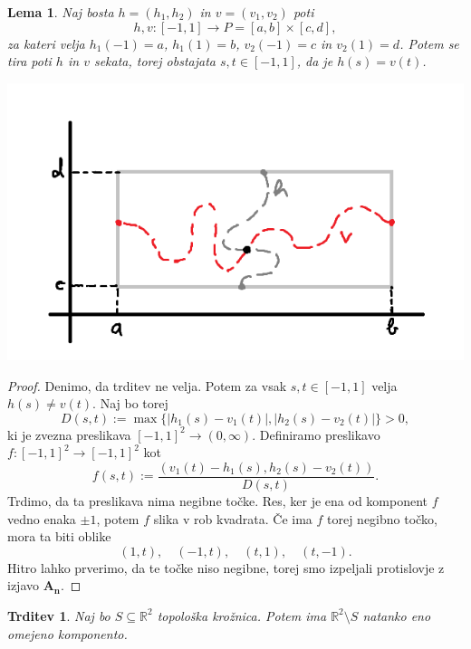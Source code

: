 \documentclass[10pt, a4paper]{article}
\newtheorem{trditev}[izr]{Trditev}
\newtheorem{lema}[izr]{Lema}
\newenvironment{noticeC}{%
  \tcolorbox[%
  notitle,
  empty,
  enhanced,  %
  breakable,
  coltext=black, 
  fontupper=\rmfamily,
  parbox=false,
  noparskip,
  sharp corners,
  boxrule=-1pt,  %
  frame hidden,
  left=7pt,  %
  right=7pt,
  top=5pt,
  bottom=5pt,
  before skip=2.5ex plus 2pt,
  after skip=2.5ex plus 2pt,
  overlay unbroken and last={%
  },
  ]}
{\endtcolorbox}
\newenvironment{dokaz}%
  {\begin{noticeC}\begin{proof}}%
  {\end{proof}\end{noticeC}}
\newcommand{\R}{\mathbb {R}}
\begin{document}
\begin{lema}
  Naj bosta $h = (h_1, h_2)$ in $v = (v_1, v_2)$ poti 
  $$h, v: [-1, 1] \to P = [a, b] \times [c, d],$$
  za kateri velja $h_1 (-1) = a$, $h_1 (1) = b$, $v_2 (-1) = c$ in $v_2 (1) = d$.
  Potem se tira poti $h$ in $v$ sekata, torej obstajata $s, t \in [-1, 1]$, da je $h(s) = v(t)$.
  \begin{center}
    \includegraphics[scale=0.6]{lema1.png}
  \end{center}
\end{lema}

\begin{dokaz}
  Denimo, da trditev ne velja. Potem za vsak $s, t \in [-1, 1]$ velja $h(s) \neq v(t)$.
  Naj bo torej $$D(s, t) := \max \{|h_1 (s) - v_1 (t)|, |h_2 (s) - v_2 (t)|\} > 0,$$
  ki je zvezna preslikava $[-1, 1]^2 \to (0, \infty)$.
  Definiramo preslikavo $f: [-1, 1]^2 \to [-1, 1]^2$ kot 
  $$f(s, t) := \frac{(v_1 (t) - h_1 (s), h_2 (s) - v_2 (t))}{D(s, t)}.$$
  Trdimo, da ta preslikava nima negibne točke. Res, ker je ena od komponent $f$ vedno enaka $\pm 1$, 
  potem $f$ slika v rob kvadrata. Če ima $f$ torej negibno točko, mora ta biti oblike 
  $$(1, t),\quad (-1, t),\quad (t, 1),\quad (t, -1).$$
  Hitro lahko prverimo, da te točke niso negibne, torej smo izpeljali protislovje z izjavo $\mathbf{A_n}$.
\end{dokaz}

\begin{trditev}
  Naj bo $S \subseteq \R^2$ topološka krožnica. Potem ima $\R^2 \setminus S$ natanko eno omejeno komponento. 
\end{trditev}
\end{document}
